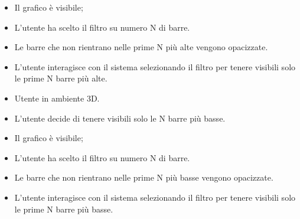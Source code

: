 { %
    \begin{itemize}
        \item Il grafico è visibile;
        \item L'utente ha scelto il filtro su numero N di barre.
    \end{itemize}
}
{ %
    \begin{itemize}
        \item Le barre che non rientrano nelle prime N più alte vengono opacizzate.
    \end{itemize}
}
{ %
    \begin{itemize}
        \item L'utente interagisce con il sistema selezionando il filtro per tenere visibili solo le prime N barre più alte.
    \end{itemize}
}


\UCdsc
{ %
    \begin{itemize}
        \item Utente in ambiente 3D.
    \end{itemize}
}
{ %
    \begin{itemize}
        \item L'utente decide di tenere visibili solo le N barre più basse.
    \end{itemize}
}
{ %
    \begin{itemize}
        \item Il grafico è visibile;
        \item L'utente ha scelto il filtro su numero N di barre.
    \end{itemize}
}
{ %
    \begin{itemize}
        \item Le barre che non rientrano nelle prime N più basse vengono opacizzate.
    \end{itemize}
}
{ %
    \begin{itemize}
        \item L'utente interagisce con il sistema selezionando il filtro per tenere visibili solo le prime N barre più basse.
    \end{itemize}
}



